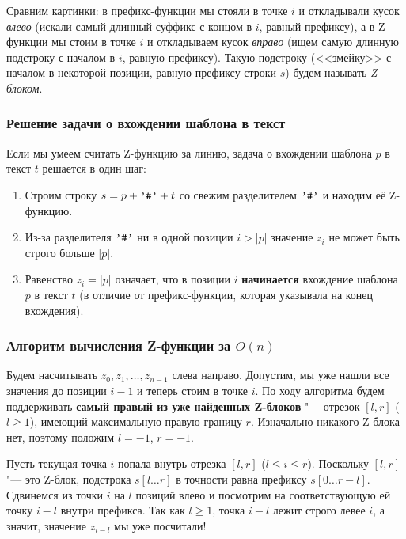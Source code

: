 Сравним картинки: в префикс-функции мы стояли в точке $i$ и откладывали кусок \textit{влево} (искали самый длинный суффикс с концом в $i$, равный префиксу), а в Z-функции мы стоим в точке $i$ и откладываем кусок \textit{вправо} (ищем самую длинную подстроку с началом в $i$, равную префиксу). Такую подстроку (<<змейку>> с началом в некоторой позиции, равную префиксу строки $s$) будем называть \textit{Z-блоком}.

\subsubsection*{Решение задачи о вхождении шаблона в текст}

Если мы умеем считать Z-функцию за линию, задача о вхождении шаблона $p$ в текст $t$ решается в один шаг:
\begin{enumerate}
    \item Строим строку $s = p + \text{\texttt{'\#'}} + t$ со свежим разделителем $\text{\texttt{'\#'}}$ и находим её Z-функцию.
    \item Из-за разделителя $\text{\texttt{'\#'}}$ ни в одной позиции $i > |p|$ значение $z_i$ не может быть строго больше $|p|$.
    \item Равенство $z_i = |p|$ означает, что в позиции $i$ \textbf{начинается} вхождение шаблона $p$ в текст $t$ (в отличие от префикс-функции, которая указывала на конец вхождения).
\end{enumerate}

\subsubsection*{Алгоритм вычисления Z-функции за $O(n)$}

Будем насчитывать $z_0, z_1, \dots, z_{n-1}$ слева направо. Допустим, мы уже нашли все значения до позиции $i - 1$ и теперь стоим в точке $i$. По ходу алгоритма будем поддерживать \textbf{самый правый из уже найденных Z-блоков} "--- отрезок $[l, r]$ ($l \ge 1$), имеющий максимальную правую границу $r$. Изначально никакого Z-блока нет, поэтому положим $l = -1$, $r = -1$.

Пусть текущая точка $i$ попала внутрь отрезка $[l, r]$ ($l \le i \le r$). Поскольку $[l, r]$ "--- это Z-блок, подстрока $s[l \dots r]$ в точности равна префиксу $s[0 \dots r - l]$. Сдвинемся из точки $i$ на $l$ позиций влево и посмотрим на соответствующую ей точку $i - l$ внутри префикса. Так как $l \ge 1$, точка $i - l$ лежит строго левее $i$, а значит, значение $z_{i-l}$ мы уже посчитали!

